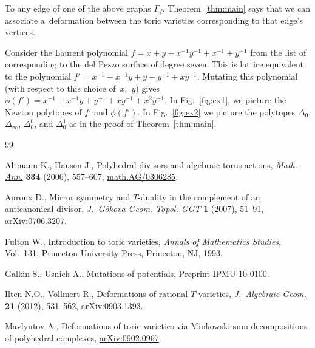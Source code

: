 \documentclass[pdftex]{sigma}
\begin{document}
	To any edge of one of the above graphs $\Gamma_f$, Theorem~\ref{thm:main} says that we can associate a~deformation between the toric varieties corresponding to that edge's vertices.
	



\begin{Example}
	Consider the Laurent polynomial $f=x+y+x^{-1}y^{-1}+x^{-1}+y^{-1}$ from the list of \cite{galkin} corresponding to the del Pezzo surface of degree seven.
	This is lattice equivalent to the polynomial $f'=x^{-1}+x^{-1}y+y+y^{-1}+xy^{-1}$. Mutating this polynomial (with respect to this choice of~$x$,~$y$) gives $\phi(f')=x^{-1}+x^{-1}y+y^{-1}+xy^{-1}+x^2y^{-1}$. In Fig.~\ref{fig:ex1}, we picture the Newton polytopes of $f'$ and $\phi(f')$. In Fig.~\ref{fig:ex2} we picture the polytopes $\Delta_0$, $\Delta_\infty$, $\Delta_0^0$, and $\Delta_0^1$ as in the proof of Theorem~\ref{thm:main}.
\end{Example}

\begin{thebibliography}{99}
\footnotesize\itemsep=0pt

Altmann K., Hausen J., Polyhedral divisors and algebraic torus actions,
  \href{http://dx.doi.org/10.1007/s00208-005-0705-8}{\textit{Math. Ann.}} \textbf{334} (2006), 557--607, \href{http://arxiv.org/abs/math.AG/0306285}{math.AG/0306285}.

Auroux D., Mirror symmetry and {$T$}-duality in the complement of an
  anticanonical divisor, \textit{J.~G\"okova Geom. Topol. GGT} \textbf{1}
  (2007), 51--91, \href{http://arxiv.org/abs/0706.3207}{arXiv:0706.3207}.

Fulton W., Introduction to toric varieties, \textit{Annals of Mathematics
  Studies}, Vol.~131, Princeton University Press, Princeton, NJ, 1993.

Galkin S., Usnich A., Mutations of potentials, {P}reprint IPMU 10-0100.

Ilten N.O., Vollmert R., Deformations of rational $T$-varieties,
  \href{http://dx.doi.org/10.1090/S1056-3911-2011-00585-7}{\textit{J.~Algebraic Geom.}} \textbf{21} (2012), 531--562, \href{http://arxiv.org/abs/0903.1393}{arXiv:0903.1393}.

Mavlyutov A., Deformations of toric varieties via {M}inkowski sum
  decompositions of polyhedral complexes, \href{http://arxiv.org/abs/0902.0967}{arXiv:0902.0967}.

\end{thebibliography}\LastPageEnding
\end{document}
